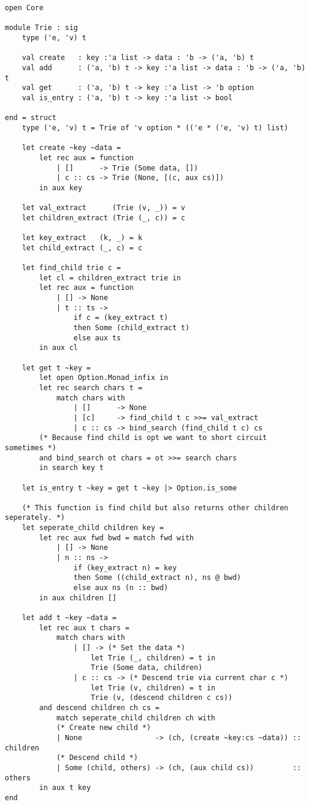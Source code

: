 \begin{verbatim}
open Core

module Trie : sig
    type ('e, 'v) t

    val create   : key :'a list -> data : 'b -> ('a, 'b) t
    val add      : ('a, 'b) t -> key :'a list -> data : 'b -> ('a, 'b) t
    val get      : ('a, 'b) t -> key :'a list -> 'b option
    val is_entry : ('a, 'b) t -> key :'a list -> bool

end = struct
    type ('e, 'v) t = Trie of 'v option * (('e * ('e, 'v) t) list)

    let create ~key ~data =
        let rec aux = function
            | []      -> Trie (Some data, [])
            | c :: cs -> Trie (None, [(c, aux cs)])
        in aux key

    let val_extract      (Trie (v, _)) = v
    let children_extract (Trie (_, c)) = c

    let key_extract   (k, _) = k
    let child_extract (_, c) = c

    let find_child trie c =
        let cl = children_extract trie in
        let rec aux = function
            | [] -> None
            | t :: ts ->
                if c = (key_extract t)
                then Some (child_extract t)
                else aux ts
        in aux cl

    let get t ~key =
        let open Option.Monad_infix in
        let rec search chars t =
            match chars with
                | []      -> None
                | [c]     -> find_child t c >>= val_extract
                | c :: cs -> bind_search (find_child t c) cs
        (* Because find child is opt we want to short circuit sometimes *)
        and bind_search ot chars = ot >>= search chars
        in search key t

    let is_entry t ~key = get t ~key |> Option.is_some

    (* This function is find child but also returns other children seperately. *)
    let seperate_child children key =
        let rec aux fwd bwd = match fwd with
            | [] -> None
            | n :: ns ->
                if (key_extract n) = key
                then Some ((child_extract n), ns @ bwd)
                else aux ns (n :: bwd)
        in aux children []

    let add t ~key ~data =
        let rec aux t chars =
            match chars with
                | [] -> (* Set the data *)
                    let Trie (_, children) = t in
                    Trie (Some data, children)
                | c :: cs -> (* Descend trie via current char c *)
                    let Trie (v, children) = t in
                    Trie (v, (descend children c cs))
        and descend children ch cs =
            match seperate_child children ch with
            (* Create new child *)
            | None                 -> (ch, (create ~key:cs ~data)) :: children
            (* Descend child *)
            | Some (child, others) -> (ch, (aux child cs))         :: others
        in aux t key
end
\end{verbatim}
